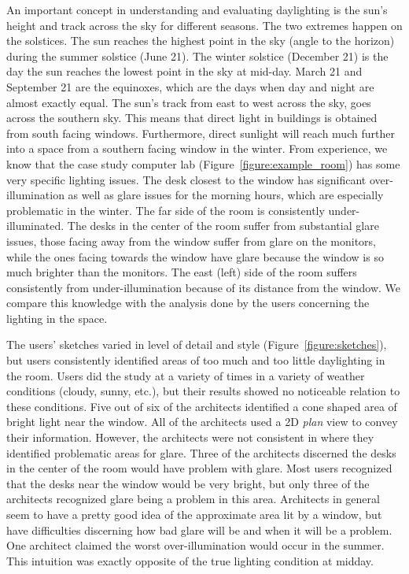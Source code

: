 \documentclass[review]{vgtc}                 %
\begin{document}
An important concept in understanding and evaluating
daylighting is the sun's height and track across the sky for different
seasons.  The two extremes happen on the solstices. The
sun reaches the highest point in the sky (angle to the horizon) during the summer
solstice (June 21).  The winter solstice
(December 21) is the day the sun reaches the lowest point in the sky
at mid-day.  March 21 and September 21 are the equinoxes, which are
the days when day and night are almost exactly equal.  The sun's track
from east to west across the sky, goes across the southern sky.  This
means that direct light in buildings is obtained from south facing
windows.  Furthermore, direct sunlight will reach much further into a
space from a southern facing window in the winter.
%
From experience, we know that the case study computer lab
(Figure~\ref{figure:example_room}) has some very specific lighting issues.
The desk closest to the window has significant over-illumination as
well as glare issues for the morning hours, which are especially
problematic in the winter.  The far side of the room is consistently
under-illuminated.  The desks in the center of the room suffer from
substantial glare issues, those facing away from the window suffer
from glare on the monitors, while the ones facing towards the window
have glare because the window is so much brighter than the monitors.
The east (left) side of the room suffers consistently from
under-illumination because of its distance from the window.  We
compare this knowledge with the analysis done by the users concerning
the lighting in the space.



The users' sketches varied in level of detail and style
(Figure~\ref{figure:sketches}), but users consistently identified
areas of too much and too little daylighting in the room.  Users did
the study at a variety of times in a variety of weather conditions
(cloudy, sunny, etc.), but their results showed no noticeable relation
to these conditions.  Five out of six of the architects identified a
cone shaped area of bright light near the window.  All of the
architects used a 2D {\em plan} view to convey their information.
However, the architects were not consistent in where they identified
problematic areas for glare.  Three of the architects discerned the
desks in the center of the room would have problem with glare.  Most
users recognized that the desks near the window would be very bright,
but only three of the architects recognized glare being a problem in
this area.  Architects in general seem to have a pretty good idea of
the approximate area lit by a window, but have difficulties discerning
how bad glare will be and when it will be a problem.  One architect
claimed the worst over-illumination would occur in the summer.  This
intuition was exactly opposite of the true lighting condition at
midday.
\end{document}
